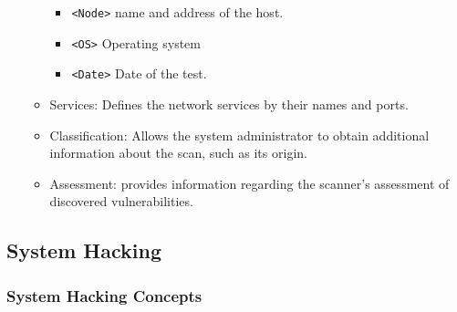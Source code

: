 \begin{itemize}
\begin{itemize}
\begin{itemize}
            \item \verb|<Node>| name and address of the host.
            \item \verb|<OS>| Operating system
            \item \verb|<Date>| Date of the test.
        \end{itemize}
        \item Services: Defines the network services by their names and ports.
        \item Classification: Allows the system administrator to obtain additional information about the scan, such as its origin.
        \item Assessment: provides information regarding the scanner's assessment of discovered vulnerabilities.
    \end{itemize}
\end{itemize}

\subsection{System Hacking}
\subsubsection{System Hacking Concepts}
